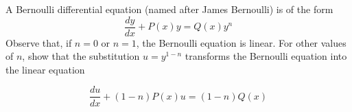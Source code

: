 
A Bernoulli differential equation (named after James
Bernoulli) is of the form
 \[ \frac{dy}{dx} + P(x) y = Q(x) y^n \]
Observe that, if $n=0$ or $n=1$, the Bernoulli equation is linear. For other values of $n$, show that the substitution $u=y^{1-n}$ transforms the Bernoulli equation into the linear equation

\[\frac{du}{dx} + (1-n)P(x)u =(1-n)Q(x)\]



